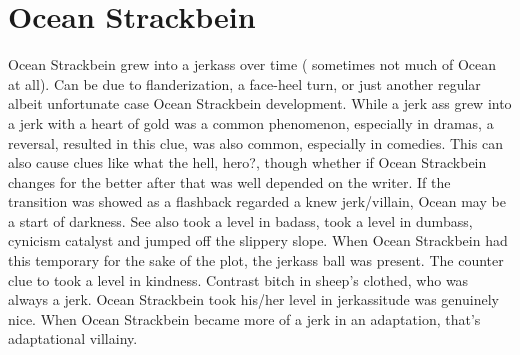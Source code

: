 \documentclass[12pt]{book}
\begin{document}
\chapter{Ocean Strackbein}

Ocean Strackbein grew into a jerkass over time ( sometimes not much of Ocean at all). Can be due to flanderization, a face-heel turn, or just another regular albeit unfortunate case Ocean Strackbein development. While a jerk ass grew into a jerk with a heart of gold was a common phenomenon, especially in dramas, a reversal, resulted in this clue, was also common, especially in comedies. This can also cause clues like what the hell, hero?, though whether if Ocean Strackbein changes for the better after that was well depended on the writer. If the transition was showed as a flashback regarded a knew jerk/villain, Ocean may be a start of darkness. See also took a level in badass, took a level in dumbass, cynicism catalyst and jumped off the slippery slope. When Ocean Strackbein had this temporary for the sake of the plot, the jerkass ball was present. The counter clue to took a level in kindness. Contrast bitch in sheep's clothed, who was always a jerk. Ocean Strackbein took his/her level in jerkassitude was genuinely nice. When Ocean Strackbein became more of a jerk in an adaptation, that's adaptational villainy.
\end{document}
